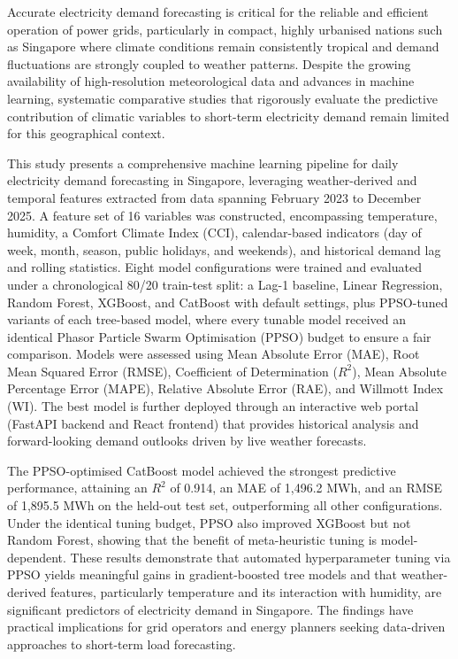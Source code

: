 
Accurate electricity demand forecasting is critical for the reliable and efficient operation of power grids, particularly in compact, highly urbanised nations such as Singapore where climate conditions remain consistently tropical and demand fluctuations are strongly coupled to weather patterns. Despite the growing availability of high-resolution meteorological data and advances in machine learning, systematic comparative studies that rigorously evaluate the predictive contribution of climatic variables to short-term electricity demand remain limited for this geographical context.

This study presents a comprehensive machine learning pipeline for daily electricity demand forecasting in Singapore, leveraging weather-derived and temporal features extracted from data spanning February 2023 to December 2025. A feature set of 16 variables was constructed, encompassing temperature, humidity, a Comfort Climate Index (CCI), calendar-based indicators (day of week, month, season, public holidays, and weekends), and historical demand lag and rolling statistics. Eight model configurations were trained and evaluated under a chronological 80/20 train-test split: a Lag-1 baseline, Linear Regression, Random Forest, XGBoost, and CatBoost with default settings, plus PPSO-tuned variants of each tree-based model, where every tunable model received an identical Phasor Particle Swarm Optimisation (PPSO) budget to ensure a fair comparison. Models were assessed using Mean Absolute Error (MAE), Root Mean Squared Error (RMSE), Coefficient of Determination ($R^2$), Mean Absolute Percentage Error (MAPE), Relative Absolute Error (RAE), and Willmott Index (WI). The best model is further deployed through an interactive web portal (FastAPI backend and React frontend) that provides historical analysis and forward-looking demand outlooks driven by live weather forecasts.

The PPSO-optimised CatBoost model achieved the strongest predictive performance, attaining an $R^2$ of 0.914, an MAE of 1{,}496.2 MWh, and an RMSE of 1{,}895.5 MWh on the held-out test set, outperforming all other configurations. Under the identical tuning budget, PPSO also improved XGBoost but not Random Forest, showing that the benefit of meta-heuristic tuning is model-dependent. These results demonstrate that automated hyperparameter tuning via PPSO yields meaningful gains in gradient-boosted tree models and that weather-derived features, particularly temperature and its interaction with humidity, are significant predictors of electricity demand in Singapore. The findings have practical implications for grid operators and energy planners seeking data-driven approaches to short-term load forecasting.

